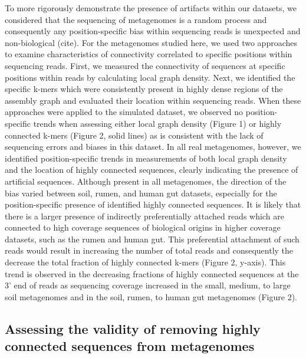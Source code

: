 \documentclass[10pt]{article}
\begin{document}
To more rigorously demonstrate the presence of artifacts within our datasets, we considered that the sequencing of metagenomes is a random process and consequently any position-specific bias within sequencing reads is unexpected and non-biological (cite).   For the metagenomes studied here, we used two approaches to examine characteristics of connectivity correlated to specific positions within sequencing reads.  First, we measured the connectivity of sequences at specific positions within reads by calculating local graph density.  Next, we identified the specific k-mers which were consistently present in highly dense regions of the assembly graph and evaluated their location within sequencing reads.  When these approaches were applied to the simulated dataset, we observed no position-specific trends when assessing either local graph density (Figure 1) or highly connected k-mers (Figure 2, solid lines) as is consistent with the lack of sequencing errors and biases in this dataset.  In all real metagenomes, however, we identified position-specific trends in measurements of both local graph density and the location of highly connected sequences, clearly indicating the presence of artificial sequences.  Although present in all metagenomes, the direction of the bias varied between soil, rumen, and human gut datasets, especially for the position-specific presence of identified highly connected sequences.  It is likely that there is a larger presence of indirectly preferentially attached reads which are connected to high coverage sequences of biological origins in higher coverage datasets, such as the rumen and human gut.  This preferential attachment of such reads would result in increasing the number of total reads and consequently the decrease the total fraction of highly connected k-mers (Figure 2, y-axis).  This trend is observed in the decreasing fractions of highly connected sequences at the 3' end of reads as sequencing coverage increased in the small, medium, to large soil metagenomes and in the soil, rumen, to human gut metagenomes (Figure 2).

\subsection*{Assessing the validity of removing highly connected sequences from metagenomes}
\end{document}
